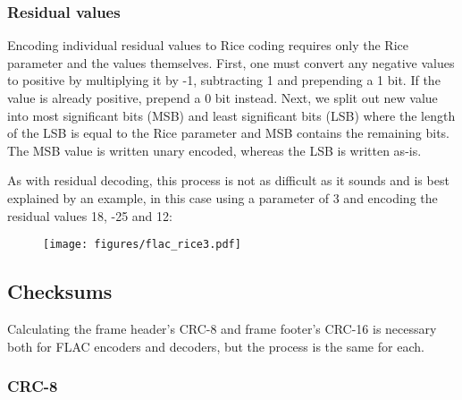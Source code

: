 \clearpage

\subsubsection{Residual values}


Encoding individual residual values to Rice coding requires only
the Rice parameter and the values themselves.
First, one must convert any negative values to positive by
multiplying it by -1, subtracting 1 and prepending a 1 bit.
If the value is already positive, prepend a 0 bit instead.
Next, we split out new value into most significant bits (MSB) and
least significant bits (LSB) where the length of the LSB is
equal to the Rice parameter and MSB contains the remaining bits.
The MSB value is written unary encoded, whereas the LSB is written as-is.

As with residual decoding, this process is not as difficult as it
sounds and is best explained by an example, in this case using
a parameter of 3 and encoding the residual values 18, -25 and 12:
\begin{figure}[h]
\texttt{[image: figures/flac\_rice3.pdf]}
\end{figure}

\clearpage

\subsection{Checksums}

Calculating the frame header's CRC-8 and frame footer's CRC-16 is necessary
both for FLAC encoders and decoders, but the process is the same for each.

\subsubsection{CRC-8}

